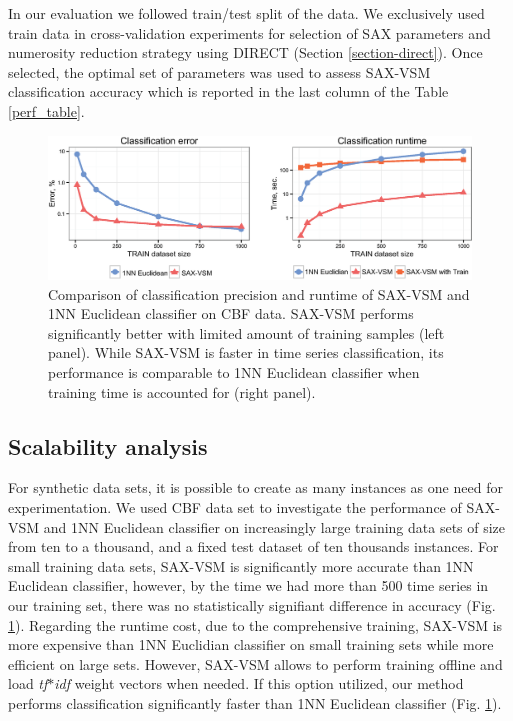 \documentclass{llncs}
\newcommand{\myfigureshrinkerless}{\vspace{-0.2cm}}
\begin{document}
In our evaluation we followed train/test split of the data. We exclusively used train data in 
cross-validation experiments for selection of SAX parameters and numerosity reduction strategy
using DIRECT (Section \ref{section-direct}). Once selected, the optimal set of parameters 
was used to assess SAX-VSM classification accuracy which is reported in the last column 
of the Table \ref{perf_table}.

\begin{figure}[b]
   \myfigureshrinkerless
   \centering
   \includegraphics[width=115mm]{figures/precision-runtime.eps}
   \caption{Comparison of classification precision and runtime of SAX-VSM and 1NN 
   Euclidean classifier on CBF data. SAX-VSM performs significantly better with limited 
   amount of training samples (left panel). While SAX-VSM is faster in time series 
   classification, its performance is comparable to 1NN Euclidean classifier when 
   training time is accounted for (right panel).}
   \label{fig:precision-runtime}
\end{figure}

\subsection{Scalability analysis}
For synthetic data sets, it is possible to create as many instances as one need for experimentation.
We used CBF data set \cite{cbf} to investigate the performance of SAX-VSM and 1NN Euclidean
classifier on increasingly large training data sets of size from ten to a thousand, and a fixed test
dataset of ten thousands instances. For small training data sets, SAX-VSM is significantly more
accurate than 1NN Euclidean classifier, however, by the time we had more than 500 time series in
our training set, there was no statistically signifiant difference in accuracy (Fig.
\ref{fig:precision-runtime}). 
Regarding the runtime cost, due to the comprehensive training, SAX-VSM is more expensive than 
1NN Euclidian classifier on small training sets while more efficient on large sets.
However, SAX-VSM allows to perform training offline and load \textit{tf$\ast$idf} weight vectors when
needed. If this option utilized, our method performs classification significantly faster than 
1NN Euclidean classifier (Fig. \ref{fig:precision-runtime}).
\end{document}

